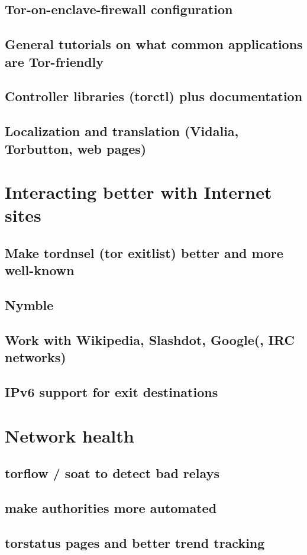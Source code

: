 \documentclass{article}
\begin{document}
\subsection{Tor-on-enclave-firewall configuration}
\subsection{General tutorials on what common applications are Tor-friendly}
\subsection{Controller libraries (torctl) plus documentation}
\subsection{Localization and translation (Vidalia, Torbutton, web pages)}
\section{Interacting better with Internet sites}
\subsection{Make tordnsel (tor exitlist) better and more well-known}
\subsection{Nymble}
\subsection{Work with Wikipedia, Slashdot, Google(, IRC networks)}
\subsection{IPv6 support for exit destinations}
\section{Network health}
\subsection{torflow / soat to detect bad relays}
\subsection{make authorities more automated}
\subsection{torstatus pages and better trend tracking}
\end{document}
